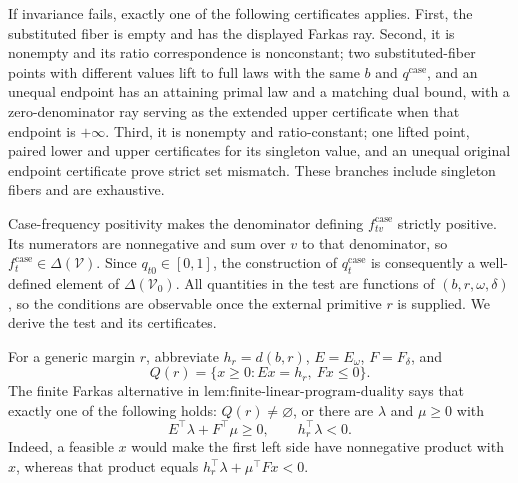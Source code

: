 If invariance fails, exactly one of the following certificates applies.  First, the substituted fiber is empty and has the displayed Farkas ray.  Second, it is nonempty and its ratio correspondence is nonconstant; two substituted-fiber points with different values lift to full laws with the same \(b\) and \(q^{\mathrm{case}}\), and an unequal endpoint has an attaining primal law and a matching dual bound, with a zero-denominator ray serving as the extended upper certificate when that endpoint is \(+\infty\).  Third, it is nonempty and ratio-constant; one lifted point, paired lower and upper certificates for its singleton value, and an unequal original endpoint certificate prove strict set mismatch.  These branches include singleton fibers and are exhaustive.

Case-frequency positivity makes the denominator defining \(f^{\mathrm{case}}_{tv}\) strictly positive.  Its numerators are nonnegative and sum over \(v\) to that denominator, so \(f_t^{\mathrm{case}}\in\Delta(\mathcal V)\).  Since \(q_{t0}\in[0,1]\), the construction of \(q_t^{\mathrm{case}}\) is consequently a well-defined element of \(\Delta(\mathcal V_0)\).  All quantities in the test are functions of \((b,r,\omega,\delta)\), so the conditions are observable once the external primitive \(r\) is supplied.  We derive the test and its certificates.

For a generic margin \(r\), abbreviate \(h_r=d(b,r)\), \(E=E_\omega\), \(F=F_\delta\), and
\[
Q(r)=\{x\geq0:Ex=h_r,\ Fx\leq0\}.
\]
The finite Farkas alternative in \(\text{lem:finite-linear-program-duality}\) says that exactly one of the following holds: \(Q(r)\ne\varnothing\), or there are \(\lambda\) and \(\mu\geq0\) with
\[
E^\top\lambda+F^\top\mu\geq0,
\qquad h_r^\top\lambda<0.
\]
Indeed, a feasible \(x\) would make the first left side have nonnegative product with \(x\), whereas that product equals \(h_r^\top\lambda+\mu^\top Fx<0\).

